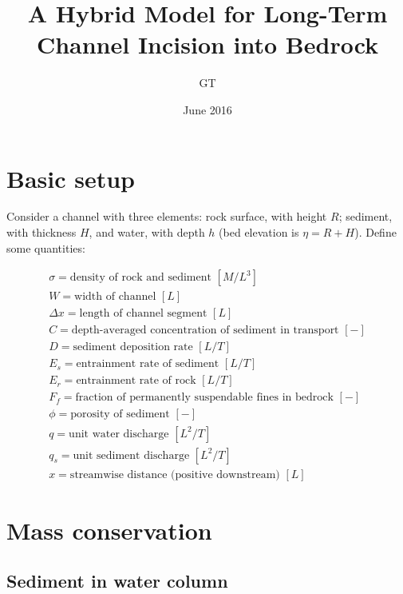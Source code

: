 \documentclass[12pt]{amsart}
\title{A Hybrid Model for Long-Term Channel Incision into Bedrock}
\author{GT}
\date{June 2016} %
\begin{document}
\maketitle

\section{Basic setup}

Consider a channel with three elements: rock surface, with height $R$; sediment, with thickness $H$, and water, with depth $h$ (bed elevation is $\eta = R+H$). Define some quantities:

\begin{eqnarray*}
\sigma = \text{density of rock and sediment } [M/L^3] \\
W = \text{width of channel } [L] \\
\Delta x = \text{length of channel segment } [L] \\
C = \text{depth-averaged concentration of sediment in transport } [-] \\
D = \text{sediment deposition rate } [L/T] \\
E_s = \text{entrainment rate of sediment } [L/T] \\
E_r = \text{entrainment rate of rock } [L/T] \\
F_f = \text{fraction of permanently suspendable fines in bedrock } [-] \\
\phi = \text{porosity of sediment } [-] \\
q = \text{unit water discharge } [L^2/T] \\
q_s = \text{unit sediment discharge } [L^2/T] \\
x = \text{streamwise distance (positive downstream) } [L]
\end{eqnarray*}

\section{Mass conservation}

\subsection{Sediment in water column}
\end{document}
